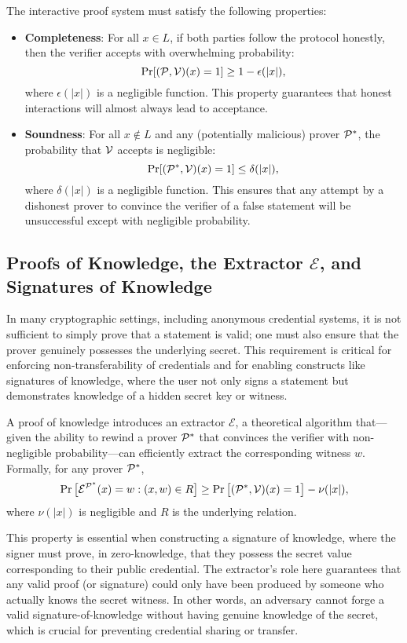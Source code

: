 The interactive proof system must satisfy the following properties:
\begin{itemize}
    \item \textbf{Completeness}: For all $x \in L$, if both parties follow the protocol honestly, then the verifier accepts with overwhelming probability:
    \[
        \Pr[(\mathcal{P},\mathcal{V})(x) = 1] \geq 1 - \epsilon(|x|),
    \]
    where $\epsilon(|x|)$ is a negligible function. This property guarantees that honest interactions will almost always lead to acceptance.
    
    \item \textbf{Soundness}: For all $x \notin L$ and any (potentially malicious) prover $\mathcal{P}^*$, the probability that $\mathcal{V}$ accepts is negligible:
    \[
        \Pr[(\mathcal{P}^*,\mathcal{V})(x) = 1] \leq \delta(|x|),
    \]
    where $\delta(|x|)$ is a negligible function. This ensures that any attempt by a dishonest prover to convince the verifier of a false statement will be unsuccessful except with negligible probability.
\end{itemize}


\subsection{Proofs of Knowledge, the Extractor $\mathcal{E}$, and Signatures of Knowledge}

In many cryptographic settings, including anonymous credential systems, it is not sufficient to simply prove that a statement is valid; one must also ensure that the prover genuinely possesses the underlying secret. This requirement is critical for enforcing non-transferability of credentials and for enabling constructs like signatures of knowledge, where the user not only signs a statement but demonstrates knowledge of a hidden secret key or witness.

A proof of knowledge introduces an extractor $\mathcal{E}$, a theoretical algorithm that—given the ability to rewind a prover $\mathcal{P}^*$ that convinces the verifier with non-negligible probability—can efficiently extract the corresponding witness $w$. Formally, for any prover $\mathcal{P}^*$,
\[
\Pr\big[\mathcal{E}^{\mathcal{P}^*}(x) = w : (x,w) \in R\big] \geq \Pr\big[(\mathcal{P}^*,\mathcal{V})(x) = 1\big] - \nu(|x|),
\]
where $\nu(|x|)$ is negligible and $R$ is the underlying relation.

This property is essential when constructing a signature of knowledge, where the signer must prove, in zero-knowledge, that they possess the secret value corresponding to their public credential. The extractor's role here guarantees that any valid proof (or signature) could only have been produced by someone who actually knows the secret witness. In other words, an adversary cannot forge a valid signature-of-knowledge without having genuine knowledge of the secret, which is crucial for preventing credential sharing or transfer. 


